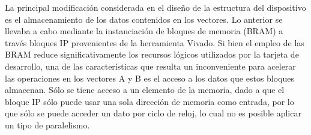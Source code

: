 \documentclass[conference]{IEEEtran}
\begin{document}
    La principal modificación considerada en el diseño de la estructura del dispositivo es el almacenamiento de los datos contenidos en los vectores. Lo anterior se llevaba a cabo mediante la instanciación de bloques de memoria (BRAM) a través bloques IP provenientes de la herramienta Vivado. Si bien el empleo de las BRAM reduce significativamente los recursos lógicos utilizados por la tarjeta de desarrollo, una de las características que resulta un inconveniente para acelerar las operaciones en los vectores A y B es el acceso a los datos que estos bloques almacenan. Sólo se tiene acceso  a un elemento de la memoria, dado a que el bloque IP sólo puede usar una sola dirección de memoria como entrada, por lo que sólo se puede acceder un dato por ciclo de reloj, lo cual no es posible aplicar un tipo de paralelismo.\par
\end{document}
